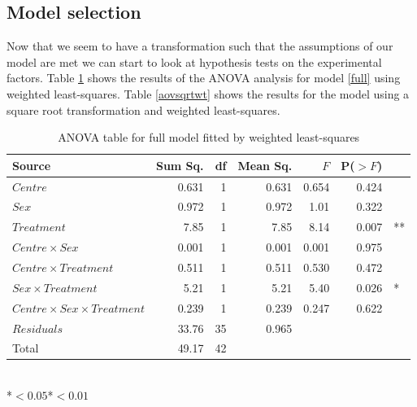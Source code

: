 \subsection{Model selection}
Now that we seem to have a transformation such that the assumptions of our model are met we can start to look at hypothesis tests on the experimental factors. Table \ref{aovwt} shows the results of the ANOVA analysis for model \ref{full} using  weighted least-squares. Table \ref{aovsqrtwt} shows the results for the model using a square root transformation and weighted least-squares.
\begin{table}[h]
\centering
\caption{ANOVA table for full model fitted by weighted least-squares}\label{aovwt}
\begin{tabular}{l|rrrrrl}
Source&Sum Sq.&df&Mean Sq.&$F$&P($>F$)\\
\hline
$Centre$     &                0.631  &1& 0.631 & 0.654 &0.424&\\
$Sex$        &              0.972  &1& 0.972 & 1.01 &0.322\\
$Treatment$  &            7.85  &1& 7.85  &8.14 &0.007 &**\\
$Centre\times Sex$ &             0.001 &1&  0.001 & 0.001 &0.975&\\
$Centre\times Treatment$ &        0.511  &1& 0.511 & 0.530 &0.472&\\
$Sex\times Treatment$     &     5.21  &1& 5.21 & 5.40 &0.026 &* \\
$Centre\times Sex\times Treatment$ &   0.239 &1&  0.239 & 0.247& 0.622&\\
$Residuals$      &    33.76 &35&  0.965  &&&\\
\hline
Total&49.17&42&&&
\end{tabular}\\
\hspace{20em}*$<0.05$\quad**$<0.01$
\end{table}
